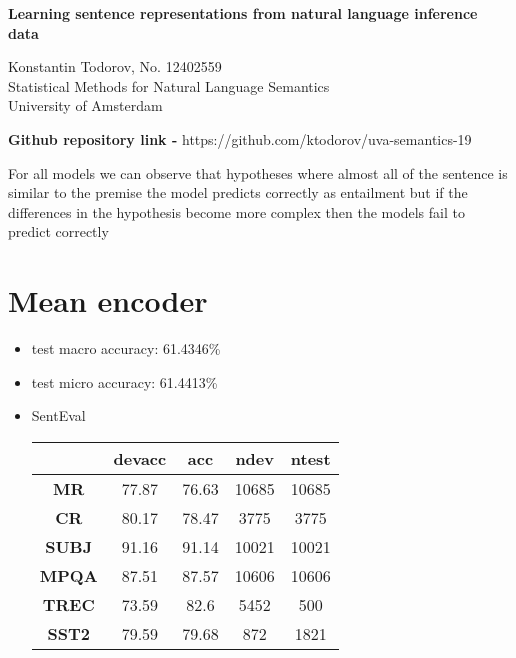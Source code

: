 \documentclass[6pt]{article}
\begin{document}
\begin{center}
  \large 
  \textbf{Learning sentence representations from natural language inference data}
  
  \normalsize Konstantin Todorov, No. 12402559 \\
  Statistical Methods for Natural Language Semantics\\
  University of Amsterdam\\
\end{center}

\textbf{Github repository link - } https://github.com/ktodorov/uva-semantics-19\\

\vspace{2\baselineskip}

For all models we can observe that hypotheses where almost all of the sentence 
is similar to the premise the model predicts correctly as entailment but if
the differences in the hypothesis become more complex then the models fail
to predict correctly

\section{Mean encoder}

\begin{itemize}
  \item test macro accuracy: 61.4346\%
  
  \item test micro accuracy: 61.4413\%
  
  \item SentEval

  \begin{center}
    \begin{tabular}{| c |c | c | c | c|} 
        \hline
        & \textbf{devacc} & \textbf{acc} & \textbf{ndev} & \textbf{ntest} \\ 
        \hline
        \textbf{MR} & 77.87 & 76.63 & 10685 & 10685 \\ 
        \hline
        \textbf{CR} & 80.17 & 78.47 & 3775 & 3775 \\
        \hline
        \textbf{SUBJ} & 91.16 & 91.14 & 10021 & 10021 \\
        \hline
        \textbf{MPQA} & 87.51 & 87.57 & 10606 & 10606 \\
        \hline
        \textbf{TREC} & 73.59 & 82.6 & 5452 & 500 \\
        \hline
        \textbf{SST2} & 79.59 & 79.68 & 872 & 1821 \\
        \hline
      \end{tabular}
    \end{center}
\end{itemize}
\end{document}
